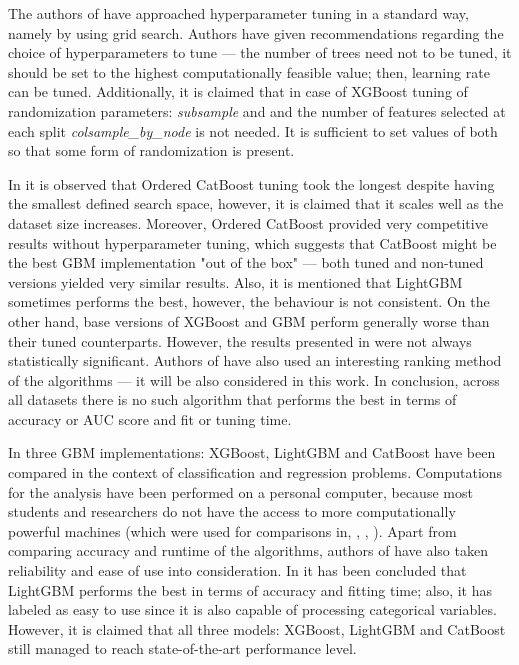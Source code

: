 \documentclass[magisterska, english]{pwr_wmat_praca_dyplomowa}
\theoremstyle{plain}
\numberwithin{theorem}{chapter}
\theoremstyle{definition}
\numberwithin{theorem}{chapter}
\begin{document}
The authors of \cite{comparative_analysis} have approached hyperparameter tuning in a standard way, namely by using grid search. Authors have given recommendations regarding the choice of hyperparameters to tune --- the number of trees need not to be tuned, it should be set to the highest computationally feasible value; then, learning rate can be tuned. Additionally, it is claimed that in case of XGBoost tuning of randomization parameters: \emph{subsample} \cite{friedman_stoch} and and the number of features selected at each split \emph{colsample\_by\_node} is not needed. It is sufficient to set values of both so that some form of randomization is present.

In \cite{comparative_analysis} it is observed that Ordered CatBoost tuning took the longest despite having the smallest defined search space, however, it is claimed that it scales well as the dataset size increases. Moreover, Ordered CatBoost provided very competitive results without hyperparameter tuning, which suggests that CatBoost might be the best GBM implementation "out of the box" --- both tuned and non-tuned versions yielded very similar results. Also, it is mentioned that LightGBM sometimes performs the best, however, the behaviour is not consistent. On the other hand, base versions of XGBoost and GBM perform generally worse than their tuned counterparts. However, the results presented in \cite{comparative_analysis} were not always statistically significant. 
Authors of \cite{comparative_analysis} have also used an interesting ranking method of the algorithms %
--- it will be also considered in this work. In conclusion, across all datasets there is no such algorithm that performs the best in terms of accuracy or AUC score and fit or tuning time.

In \cite{comparison_of} three GBM implementations: XGBoost, LightGBM and CatBoost have been compared in the context of classification and regression problems. Computations for the analysis have been performed on a personal computer, because most students and researchers do not have the access to more computationally powerful machines (which were used for comparisons in\cite{xgboost}, \cite{lightgbm}, \cite{catboost} \cite{comparative_analysis}, \cite{competitive_analysis}). Apart from comparing accuracy and runtime of the algorithms, authors of \cite{comparison_of} have also taken reliability and ease of use into consideration. In \cite{comparative_analysis} it has been concluded that LightGBM performs the best in terms of accuracy and fitting time; also, it has labeled as easy to use since it is also capable of processing categorical variables. However, it is claimed that all three models: XGBoost, LightGBM and CatBoost still managed to reach state-of-the-art performance level. 
\end{document}
